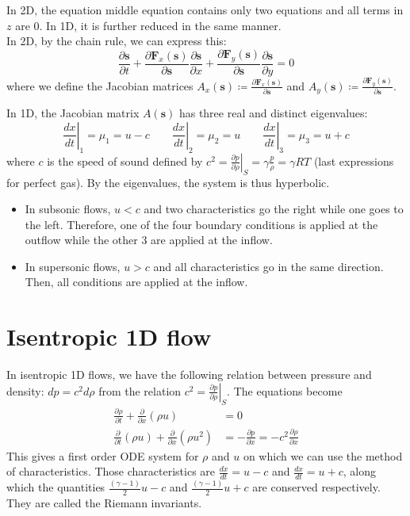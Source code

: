\documentclass[12pt, openany]{report}
\theoremstyle{definition}
\begin{document}
In 2D, the equation middle equation contains only two equations and all terms in $z$ are 0. In 1D, it is further reduced in the same manner. \\ In 2D, by the chain rule, we can express this: 
\begin{equation}
	\frac{\partial \boldsymbol{s}}{\partial t} + \frac{\partial \boldsymbol{F}_x(\boldsymbol{s})}{\partial \boldsymbol{s}}\frac{\partial \boldsymbol{s}}{\partial x} + \frac{\partial \boldsymbol{F}_y(\boldsymbol{s})}{\partial \boldsymbol{s}} \frac{\partial \boldsymbol{s}}{\partial y} = 0
\end{equation}
where we define the Jacobian matrices $A_x(\boldsymbol{s})\coloneqq \frac{\partial \boldsymbol{F}_x(\boldsymbol{s})}{\partial \boldsymbol{s}}$ and $A_y(\boldsymbol{s})\coloneqq \frac{\partial \boldsymbol{F}_y(\boldsymbol{s})}{\partial \boldsymbol{s}}$. 

In 1D, the Jacobian matrix $A(\boldsymbol{s})$ has three real and distinct eigenvalues: 
\begin{equation}
	\left.\frac{dx}{dt}\right|_1 = \mu_1 = u-c \qquad \left.\frac{dx}{dt}\right|_2 = \mu_2 = u \qquad \left.\frac{dx}{dt}\right|_3 = \mu_3 = u+c 
\end{equation}
where $c$ is the speed of sound defined by $c^2 = \left.\frac{\partial p}{\partial \rho}\right|_S = \gamma \frac{p}{\rho}=\gamma RT$ (last expressions for perfect gas). By the eigenvalues, the system is thus hyperbolic. 
\begin{itemize}
	\item In subsonic flows, $u<c$ and two characteristics go the right while one goes to the left. Therefore, one of the four boundary conditions is applied at the outflow while the other 3 are applied at the inflow. 
	\item In supersonic flows, $u>c$ and all characteristics go in the same direction. Then, all conditions are applied at the inflow. 
\end{itemize}
\section{Isentropic 1D flow}
In isentropic 1D flows, we have the following relation between pressure and density: $dp=c^2d\rho$ from the relation $c^2=\left.\frac{\partial p}{\partial \rho}\right|_S$. The equations become 
\begin{equation}
	\begin{aligned}
		\frac{\partial \rho}{\partial t} + \frac{\partial }{\partial x}(\rho u) &= 0 \\
		\frac{\partial}{\partial t}(\rho u) + \frac{\partial}{\partial x}(\rho u^2)&=-\frac{\partial p}{\partial x} = -c^2 \frac{\partial \rho}{\partial x}
	\end{aligned}
\end{equation}
This gives a first order ODE system for $\rho$ and $u$ on which we can use the method of characteristics. Those characteristics are $\frac{dx}{dt}=u-c$ and $\frac{dx}{dt} = u+c$, along which the quantities $\frac{(\gamma-1)}{2}u-c$ and $\frac{(\gamma-1)}{2}u+c$ are conserved respectively. They are called the Riemann invariants. \\
\end{document}
